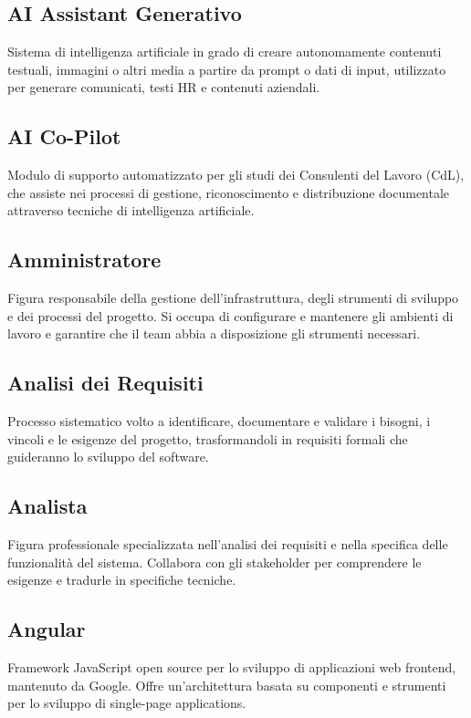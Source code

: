 \documentclass[a4paper,11pt]{article}
\begin{document}
\subsection{AI Assistant Generativo}
Sistema di intelligenza artificiale in grado di creare autonomamente contenuti testuali, immagini o altri media a partire da prompt o dati di input, utilizzato per generare comunicati, testi HR e contenuti aziendali.

\subsection{AI Co-Pilot}
Modulo di supporto automatizzato per gli studi dei Consulenti del Lavoro (CdL), che assiste nei processi di gestione, riconoscimento e distribuzione documentale attraverso tecniche di intelligenza artificiale.

\subsection{Amministratore}
Figura responsabile della gestione dell'infrastruttura, degli strumenti di sviluppo e dei processi del progetto. Si occupa di configurare e mantenere gli ambienti di lavoro e garantire che il team abbia a disposizione gli strumenti necessari.

\subsection{Analisi dei Requisiti}
Processo sistematico volto a identificare, documentare e validare i bisogni, i vincoli e le esigenze del progetto, trasformandoli in requisiti formali che guideranno lo sviluppo del software.

\subsection{Analista}
Figura professionale specializzata nell'analisi dei requisiti e nella specifica delle funzionalità del sistema. Collabora con gli stakeholder per comprendere le esigenze e tradurle in specifiche tecniche.

\subsection{Angular}
Framework JavaScript open source per lo sviluppo di applicazioni web frontend, mantenuto da Google. Offre un'architettura basata su componenti e strumenti per lo sviluppo di single-page applications.
\end{document}
